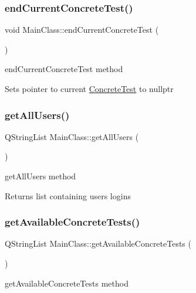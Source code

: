 \subsubsection{\texorpdfstring{end\+Current\+Concrete\+Test()}{endCurrentConcreteTest()}}
{\footnotesize\ttfamily void Main\+Class\+::end\+Current\+Concrete\+Test (\begin{DoxyParamCaption}{ }\end{DoxyParamCaption})}



end\+Current\+Concrete\+Test method 

Sets pointer to current \hyperlink{class_concrete_test}{Concrete\+Test} to nullptr \mbox{\label{class_main_class_a4b7b9aa5957f262b49b77b2c75eca17b}} 
\subsubsection{\texorpdfstring{get\+All\+Users()}{getAllUsers()}}
{\footnotesize\ttfamily Q\+String\+List Main\+Class\+::get\+All\+Users (\begin{DoxyParamCaption}{ }\end{DoxyParamCaption})}



get\+All\+Users method 

\begin{DoxyReturn}{Returns}
list containing users logins 
\end{DoxyReturn}
\mbox{\label{class_main_class_af4f98508f69bb511d03858c4193aaa90}} 
\subsubsection{\texorpdfstring{get\+Available\+Concrete\+Tests()}{getAvailableConcreteTests()}}
{\footnotesize\ttfamily Q\+String\+List Main\+Class\+::get\+Available\+Concrete\+Tests (\begin{DoxyParamCaption}{ }\end{DoxyParamCaption})}



get\+Available\+Concrete\+Tests method 

